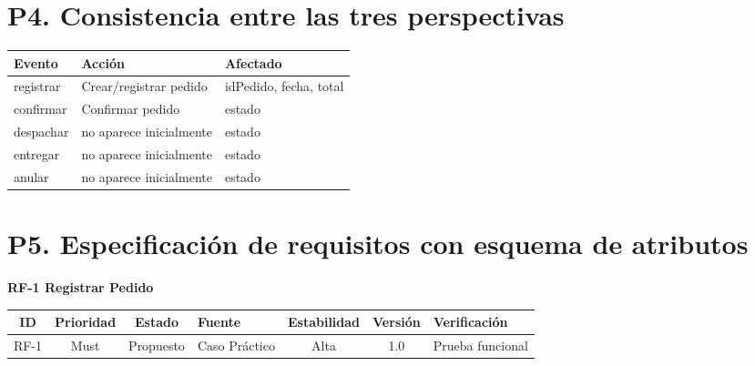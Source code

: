 \documentclass[12pt,a4paper]{article}
\renewcommand{\arraystretch}{1.18}
\begin{document}
\section*{P4. Consistencia entre las tres perspectivas}

\begin{center}
\small
\setlength{\tabcolsep}{5pt}
\begin{tabularx}{0.96\textwidth}{|>{\raggedright\arraybackslash}p{2.2cm}|>{\raggedright\arraybackslash}X|>{\raggedright\arraybackslash}p{4.0cm}|}
\hline
\textbf{Evento} & \textbf{Acción} & \textbf{Afectado} \\
\hline
registrar & Crear/registrar pedido & idPedido, fecha, total \\
\hline
confirmar & Confirmar pedido & estado \\
\hline
despachar & no aparece inicialmente & estado \\
\hline
entregar & no aparece inicialmente & estado \\
\hline
anular & no aparece inicialmente & estado \\
\hline
\end{tabularx}
\end{center}

\section*{P5. Especificación de requisitos con esquema de atributos}
\vspace{-0.15cm}

\textbf{RF-1 Registrar Pedido}

\begin{center}
\small
\setlength{\tabcolsep}{3.6pt}
\renewcommand{\arraystretch}{1.08}
\begin{tabularx}{0.98\textwidth}{|c|c|c|Y|c|c|Y|}
\hline
\textbf{ID} & \textbf{Prioridad} & \textbf{Estado} & \textbf{Fuente} & \textbf{Estabilidad} & \textbf{Versión} & \textbf{Verificación} \\
\hline
RF-1 & Must & Propuesto & Caso Práctico & Alta & 1.0 & Prueba funcional \\
\hline
\end{tabularx}
\end{center}
\end{document}
